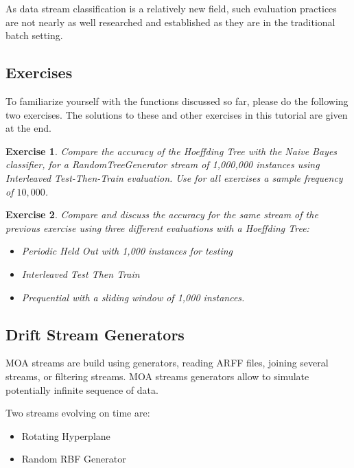 \documentclass[a4paper,12pt]{article}
\newtheorem{exercise}{Exercise}{}
\begin{document}
As data stream classification is a relatively new field, such evaluation 
practices are not nearly as well researched and established as they are
in the traditional batch setting. 


\subsection{Exercises}

To familiarize yourself with the functions discussed so far, please do the following
two exercises. The solutions to these and other exercises in this tutorial are given
at the end.

\begin{exercise}
Compare the accuracy of the Hoeffding Tree with the Naive Bayes classifier, for a RandomTreeGenerator stream of 1,000,000 instances using Interleaved Test-Then-Train evaluation.
Use for all exercises a sample frequency of $10,000$.
\end{exercise}
\begin{exercise}
Compare and discuss the accuracy for the same stream of the previous exercise using three different evaluations with a Hoeffding Tree:
\begin{itemize}
 \item Periodic Held Out with 1,000 instances for testing
 \item Interleaved Test Then Train
 \item Prequential with a sliding window of 1,000 instances.
\end{itemize}
\end{exercise}


\subsection{Drift Stream Generators}

MOA streams are build using generators, reading ARFF files, joining several streams, or filtering streams.
MOA streams generators allow to simulate potentially infinite sequence of data.

Two streams evolving on time are:
\begin{itemize}
\item Rotating Hyperplane
\item Random RBF Generator
\end{itemize}
\end{document}

